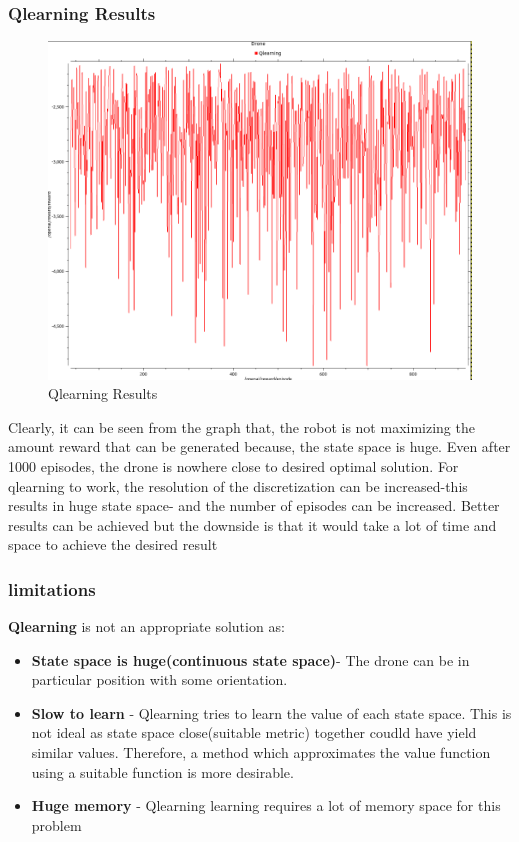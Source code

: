 \documentclass[12pt]{article}
\begin{document}
\subsubsection{Qlearning Results}
\begin{figure}[h]
    \centering
    \includegraphics[width=12cm]{qlearn}
    \caption{Qlearning Results}
    \label{fig:3D environment created in matplotlib}
\end{figure}

Clearly, it can be seen from the graph that, the robot is not maximizing the amount reward that can be generated because, the state space is
huge. Even after 1000 episodes, the drone is nowhere close to desired optimal solution.  For qlearning to work, the resolution of the 
discretization can be increased-this results in huge state space- and the number of episodes can be increased. Better results can be achieved
but the downside is that it would take a lot of time and space to achieve the desired result

\subsubsection{limitations}
\textbf{Qlearning} is not an appropriate solution as:
\begin{itemize}
  \item \textbf{State space is huge(continuous state space)}- The drone can be in particular position with some orientation. 
  \item \textbf{Slow to learn} - Qlearning tries to learn the value of each state space. This is not ideal as state space
        close(suitable metric) together coudld have yield similar values. Therefore, a method which approximates the value function
        using a suitable function is more desirable.
  \item \textbf{Huge memory} - Qlearning learning requires a lot of memory space for this problem
\end{itemize}
\end{document}
